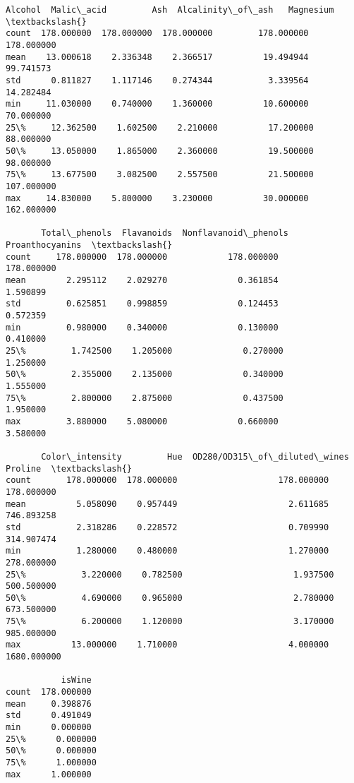 \documentclass[11pt]{article}
\makeatletter
\newcommand{\boxspacing}{\kern\kvtcb@left@rule\kern\kvtcb@boxsep}
\newcommand{\prompt}[4]{
        {\ttfamily\llap{{\color{#2}[#3]:\hspace{3pt}#4}}\vspace{-\baselineskip}}
    }
\makeatother
\begin{document}
            \begin{tcolorbox}[breakable, size=fbox, boxrule=.5pt, pad at break*=1mm, opacityfill=0]
\prompt{Out}{outcolor}{6}{\boxspacing}
\begin{Verbatim}[commandchars=\\\{\}]
          Alcohol  Malic\_acid         Ash  Alcalinity\_of\_ash   Magnesium  \textbackslash{}
count  178.000000  178.000000  178.000000         178.000000  178.000000
mean    13.000618    2.336348    2.366517          19.494944   99.741573
std      0.811827    1.117146    0.274344           3.339564   14.282484
min     11.030000    0.740000    1.360000          10.600000   70.000000
25\%     12.362500    1.602500    2.210000          17.200000   88.000000
50\%     13.050000    1.865000    2.360000          19.500000   98.000000
75\%     13.677500    3.082500    2.557500          21.500000  107.000000
max     14.830000    5.800000    3.230000          30.000000  162.000000

       Total\_phenols  Flavanoids  Nonflavanoid\_phenols  Proanthocyanins  \textbackslash{}
count     178.000000  178.000000            178.000000       178.000000
mean        2.295112    2.029270              0.361854         1.590899
std         0.625851    0.998859              0.124453         0.572359
min         0.980000    0.340000              0.130000         0.410000
25\%         1.742500    1.205000              0.270000         1.250000
50\%         2.355000    2.135000              0.340000         1.555000
75\%         2.800000    2.875000              0.437500         1.950000
max         3.880000    5.080000              0.660000         3.580000

       Color\_intensity         Hue  OD280/OD315\_of\_diluted\_wines      Proline  \textbackslash{}
count       178.000000  178.000000                    178.000000   178.000000
mean          5.058090    0.957449                      2.611685   746.893258
std           2.318286    0.228572                      0.709990   314.907474
min           1.280000    0.480000                      1.270000   278.000000
25\%           3.220000    0.782500                      1.937500   500.500000
50\%           4.690000    0.965000                      2.780000   673.500000
75\%           6.200000    1.120000                      3.170000   985.000000
max          13.000000    1.710000                      4.000000  1680.000000

           isWine
count  178.000000
mean     0.398876
std      0.491049
min      0.000000
25\%      0.000000
50\%      0.000000
75\%      1.000000
max      1.000000
\end{Verbatim}
\end{tcolorbox}
        
\end{document}
